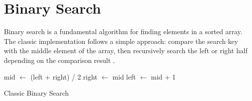 



\section{Binary Search}
\label{tb:binary_search}

Binary search is a fundamental algorithm for finding elements in a sorted array. The classic implementation follows a simple approach: compare the search key with the middle element of the array, then recursively search the left or right half depending on the comparison result \citep{binary_search}.
\begin{algorithm}
  \BlankLine
  {
    mid $\leftarrow$ (left + right) / 2\;
    {
      right $\leftarrow$ mid\;
    }
    \Else
    {
      left $\leftarrow$ mid + 1\;
    }
  }
  \caption{Classic Binary Search}%
  \label{alg:binary_search}
\end{algorithm}

